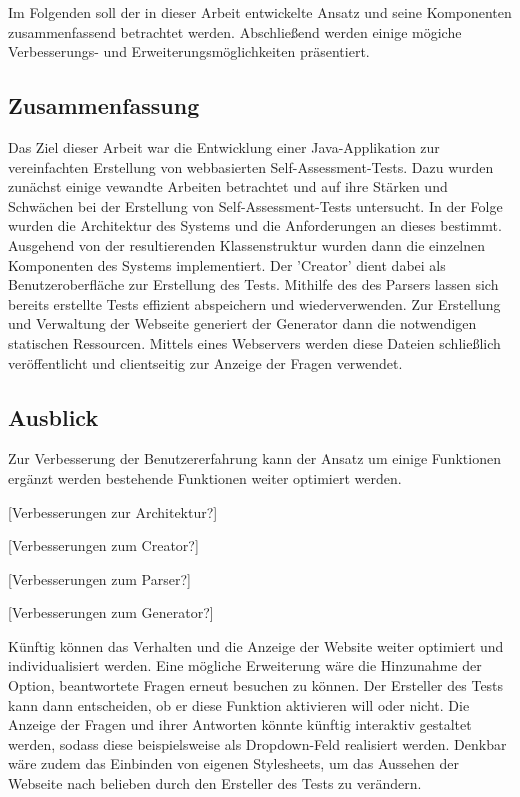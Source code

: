 \label{Zusammenfassung_Ausblick} 

Im Folgenden soll der in dieser Arbeit entwickelte Ansatz und seine Komponenten zusammenfassend betrachtet werden. Abschließend werden einige mögiche Verbesserungs- und Erweiterungsmöglichkeiten präsentiert.

\subsection{Zusammenfassung}

Das Ziel dieser Arbeit war die Entwicklung einer Java-Applikation zur vereinfachten Erstellung von webbasierten Self-Assessment-Tests. Dazu wurden zunächst einige vewandte Arbeiten betrachtet und auf ihre Stärken und Schwächen bei der Erstellung von Self-Assessment-Tests untersucht. In der Folge wurden die Architektur des Systems und die Anforderungen an dieses bestimmt. Ausgehend von der resultierenden Klassenstruktur wurden dann die einzelnen Komponenten des Systems implementiert. Der 'Creator' dient dabei als Benutzeroberfläche zur Erstellung des Tests. Mithilfe des des Parsers lassen sich bereits erstellte Tests effizient abspeichern und wiederverwenden. Zur Erstellung und Verwaltung der Webseite generiert der Generator dann die notwendigen statischen Ressourcen. Mittels eines Webservers werden diese Dateien schließlich veröffentlicht und clientseitig zur Anzeige der Fragen verwendet.

\subsection{Ausblick}

Zur Verbesserung der Benutzererfahrung kann der Ansatz um einige Funktionen ergänzt werden bestehende Funktionen weiter optimiert werden. 

[Verbesserungen zur Architektur?]

[Verbesserungen zum Creator?]

[Verbesserungen zum Parser?]

[Verbesserungen zum Generator?]

Künftig können das Verhalten und die Anzeige der Website weiter optimiert und individualisiert werden.  Eine mögliche Erweiterung wäre die Hinzunahme der Option, beantwortete Fragen erneut besuchen zu können. Der Ersteller des Tests kann dann entscheiden, ob er diese Funktion aktivieren will oder nicht. Die Anzeige der Fragen und ihrer Antworten könnte künftig interaktiv gestaltet werden, sodass diese beispielsweise als Dropdown-Feld realisiert werden. Denkbar wäre zudem das Einbinden von eigenen Stylesheets, um das Aussehen der Webseite nach belieben durch den Ersteller des Tests zu verändern. 


